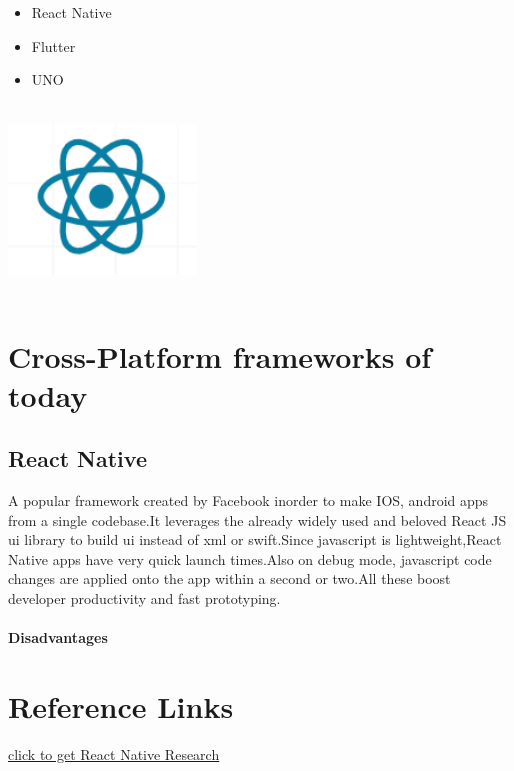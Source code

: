 \documentclass[14pt]{extarticle}
\begin{document}
\begin{itemize}
    \item React Native
    \item Flutter
    \item UNO
\end{itemize}

\vfil

\includegraphics[width=50mm,height=50mm,keepaspectratio]{react native logo.png}

\newpage
\section{Cross-Platform frameworks of today}
\subsection{React Native}
\parbox{\linewidth}{
    A popular framework created by Facebook inorder to make IOS, android apps from a single codebase.It leverages the already widely used and beloved React JS ui library to build ui instead of xml or swift.Since javascript is lightweight,React Native apps have very quick launch times.Also on debug mode, javascript code changes are applied onto the app
    within a second or two.All these boost developer productivity and fast prototyping.
}

\paragraph{Disadvantages}

\newpage
\section{Reference Links}
\href{https://techexactly.com/blogs/advantages-and-disadvantages-of-using-react-native}{click to get React Native Research}
\end{document}
